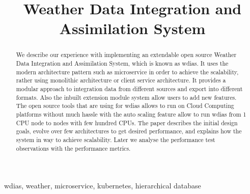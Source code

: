 \documentclass[conference]{IEEEtran}
\begin{document}
\title{Weather Data Integration and Assimilation System\\
}

\author{
\and
{}
}

\maketitle

\begin{abstract}
We describe our experience with implementing an extendable open source Weather Data Integration and Assimilation System, which is known as \acrshort{wdias}. It uses the modern architecture pattern such as microservice in order to achieve the scalability, rather using monolithic architecture or client service architecture. It provides a modular approach to integration data from different sources and export into different formats. Also the inbuilt extension module system allow users to add new features. The open source tools that are using for \acrshort{wdias} allows to run on Cloud Computing platforms without much hassle with the auto scaling feature allow to run \acrshort{wdias} from 1 CPU node to nodes with few hundred CPUs. The paper describes the initial design goals, evolve over few architectures to get desired performance, and explains how the system in way to achieve scalability. Later we analyse the performance test observations with the performance metrics.
\end{abstract}

\begin{IEEEkeywords}
\acrshort{wdias}, weather, microservice, kubernetes, hierarchical database 
\end{IEEEkeywords}

\end{document}
